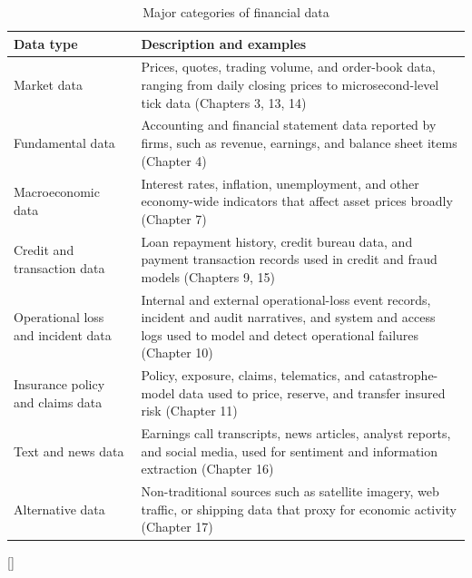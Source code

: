 \documentclass[../ai_in_finance]{subfiles}
\begin{document}
\begin{table}[htbp]
\centering
\begin{lrbox}{\bookmeasuredbox}
\begin{tabular}{p{2.6cm}p{9.4cm}}
\toprule
Data type & Description and examples \\
\midrule
Market data & Prices, quotes, trading volume, and order-book data, ranging from daily closing prices to microsecond-level tick data (Chapters 3, 13, 14) \\
Fundamental data & Accounting and financial statement data reported by firms, such as revenue, earnings, and balance sheet items (Chapter 4) \\
Macroeconomic data & Interest rates, inflation, unemployment, and other economy-wide indicators that affect asset prices broadly (Chapter 7) \\
Credit and transaction data & Loan repayment history, credit bureau data, and payment transaction records used in credit and fraud models (Chapters 9, 15) \\
Operational loss and incident data & Internal and external operational-loss event records, incident and audit narratives, and system and access logs used to model and detect operational failures (Chapter 10) \\
Insurance policy and claims data & Policy, exposure, claims, telematics, and catastrophe-model data used to price, reserve, and transfer insured risk (Chapter 11) \\
Text and news data & Earnings call transcripts, news articles, analyst reports, and social media, used for sentiment and information extraction (Chapter 16) \\
Alternative data & Non-traditional sources such as satellite imagery, web traffic, or shipping data that proxy for economic activity (Chapter 17) \\
\bottomrule
\end{tabular}
\end{lrbox}
\ifdim\wd\bookmeasuredbox<0.65\linewidth
\setlength{\bookcapwidth}{0.65\linewidth}
\else
\setlength{\bookcapwidth}{\wd\bookmeasuredbox}
\fi
{}[\bookcapwidth]{
\usebox{\bookmeasuredbox}
}{
\caption{Major categories of financial data}
\label{tab:data_types}
}
\end{table}
\end{document}
